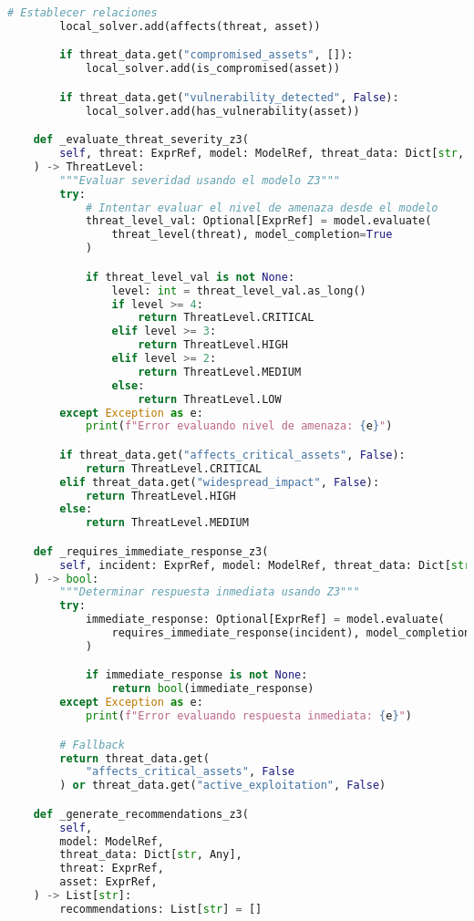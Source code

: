 \begin{lstlisting}[language=python, inputencoding=utf8]
        # Establecer relaciones
        local_solver.add(affects(threat, asset))

        if threat_data.get("compromised_assets", []):
            local_solver.add(is_compromised(asset))

        if threat_data.get("vulnerability_detected", False):
            local_solver.add(has_vulnerability(asset))

    def _evaluate_threat_severity_z3(
        self, threat: ExprRef, model: ModelRef, threat_data: Dict[str, Any]
    ) -> ThreatLevel:
        """Evaluar severidad usando el modelo Z3"""
        try:
            # Intentar evaluar el nivel de amenaza desde el modelo
            threat_level_val: Optional[ExprRef] = model.evaluate(
                threat_level(threat), model_completion=True
            )

            if threat_level_val is not None:
                level: int = threat_level_val.as_long()
                if level >= 4:
                    return ThreatLevel.CRITICAL
                elif level >= 3:
                    return ThreatLevel.HIGH
                elif level >= 2:
                    return ThreatLevel.MEDIUM
                else:
                    return ThreatLevel.LOW
        except Exception as e:
            print(f"Error evaluando nivel de amenaza: {e}")

        if threat_data.get("affects_critical_assets", False):
            return ThreatLevel.CRITICAL
        elif threat_data.get("widespread_impact", False):
            return ThreatLevel.HIGH
        else:
            return ThreatLevel.MEDIUM

    def _requires_immediate_response_z3(
        self, incident: ExprRef, model: ModelRef, threat_data: Dict[str, Any]
    ) -> bool:
        """Determinar respuesta inmediata usando Z3"""
        try:
            immediate_response: Optional[ExprRef] = model.evaluate(
                requires_immediate_response(incident), model_completion=True
            )

            if immediate_response is not None:
                return bool(immediate_response)
        except Exception as e:
            print(f"Error evaluando respuesta inmediata: {e}")

        # Fallback
        return threat_data.get(
            "affects_critical_assets", False
        ) or threat_data.get("active_exploitation", False)

    def _generate_recommendations_z3(
        self,
        model: ModelRef,
        threat_data: Dict[str, Any],
        threat: ExprRef,
        asset: ExprRef,
    ) -> List[str]:
        recommendations: List[str] = []


\end{lstlisting}
